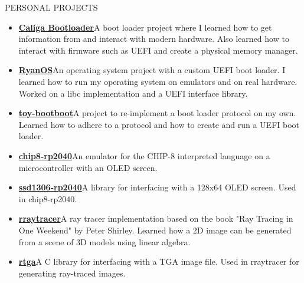 \documentclass{resume} %
\begin{document}

\begin{rSection}{PERSONAL PROJECTS}
\begin{itemize}
	\itemsep -8pt{}
	\item \href{https://github.com/raccog/caliga-bootloader}{\textbf{Caliga Bootloader}}\quad A boot loader project where I learned how to get information from and interact with modern hardware. Also learned how to interact with firmware such as UEFI and create a physical memory manager.
	\item \href{https://github.com/raccog/RyanOS}{\textbf{RyanOS}}\quad An operating system project with a custom UEFI boot loader. I learned how to run my operating system on emulators and on real hardware. Worked on a libc implementation and a UEFI interface library.
	\item \href{https://github.com/raccog/toy-bootboot}{\textbf{toy-bootboot}}\quad A project to re-implement a boot loader protocol on my own. Learned how to adhere to a protocol and how to create and run a UEFI boot loader.
	\item \href{https://github.com/raccog/chip8-rp2040}{\textbf{chip8-rp2040}}\quad An emulator for the CHIP-8 interpreted language on a microcontroller with an OLED screen.
	\item \href{https://github.com/raccog/ssd1306-rp2040}{\textbf{ssd1306-rp2040}}\quad A library for interfacing with a 128x64 OLED screen. Used in chip8-rp2040.
	\item \href{https://github.com/raccog/rraytracer}{\textbf{rraytracer}}\quad A ray tracer implementation based on the book "Ray Tracing in One Weekend" by Peter Shirley. Learned how a 2D image can be generated from a scene of 3D models using linear algebra.
	\item \href{https://github.com/raccog/rtga}{\textbf{rtga}}\quad A C library for interfacing with a TGA image file. Used in rraytracer for generating ray-traced images.
\end{itemize}
\end{rSection}
\end{document}
